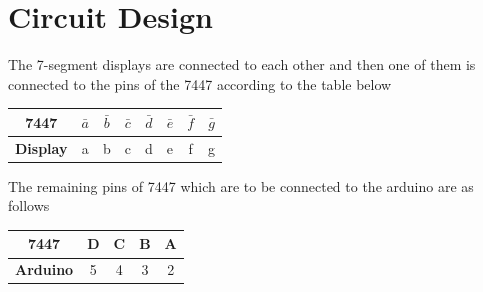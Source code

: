 \documentclass[a4paper,12pt]{article}
\begin{document}
\section{Circuit Design}
The 7-segment displays are connected to each other and then one of them is connected to the pins of the 7447 according to  the table below

\begin{table}[h]
    \centering
    \begin{tabular}{|c|c|c|c|c|c|c|c|}
        \hline
        \textbf{7447} & $\bar{a}$ & $\bar{b}$ & $\bar{c}$ & $\bar{d}$ & $\bar{e}$ & $\bar{f}$ & $\bar{g}$ \\ \hline
        \textbf{Display} & a & b & c & d & e & f & g \\ \hline
    \end{tabular}
\end{table}
The remaining pins of 7447 which are to be connected to the arduino are as follows
\begin{table}[h]
    \centering
    \begin{tabular}{|c|c|c|c|c|}
        \hline
        \textbf{7447} & D & C & B & A \\ \hline
        \textbf{Arduino} & 5 & 4 & 3 & 2 \\ \hline
    \end{tabular}
\end{table}
\end{document}
